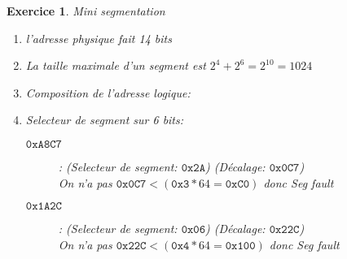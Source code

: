 \documentclass{article}
\theoremstyle{plain}
\newtheorem{exo}{Exercice}%
\begin{document}
\begin{exo}Mini segmentation
\begin{enumerate}
    \item l'adresse physique fait 14 bits
    \item La taille maximale d'un segment est $2^4 + 2^6 = 2^{10} = 1024$
    \item Composition de l'adresse logique:\\
    \item Selecteur de segment sur 6 bits:
        \begin{description}
            \item[$\mathtt{0xA8C7}$]: (Selecteur de segment: $\mathtt{0x2A}$) (Décalage: $\mathtt{0x0C7}$)\\
                On n'a pas $\mathtt{0x0C7} < (\mathtt{0x3} * 64 = \mathtt{0xC0})$ donc Seg fault


            \item[$\mathtt{0x1A2C}$]: (Selecteur de segment: $\mathtt{0x06}$) (Décalage: $\mathtt{0x22C}$)\\
                On n'a pas $\mathtt{0x22C} < (\mathtt{0x4} * 64 = \mathtt{0x100})$ donc Seg fault
        \end{description}
\end{enumerate}
\end{exo}
\end{document}
